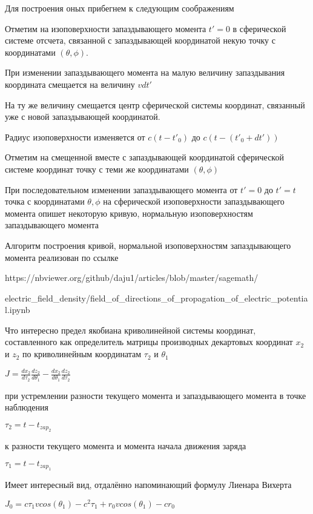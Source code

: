 \documentclass{article}
\begin{document}
Для построения оных прибегнем к следующим соображениям 

Отметим на изоповерхности запаздывающего момента $t'=0$ в сферической системе отсчета, связанной с запаздывающей координатой некую точку с координатами $(\theta, \phi)$.

При изменении запаздывающего момента на малую величину запаздывания координата смещается на величину $v dt'$

На ту же величину смещается центр сферической системы координат, связанный уже с новой запаздывающей координатой.

Радиус изоповерхности изменяется от $c(t-t'_{0})$ до $c(t-(t'_{0} + d t'))$


Отметим на смещенной вместе с запаздывающей координатой сферической системе координат точку с теми же координатами $(\theta, \phi)$


При последовательном изменении запаздывающего момента от $t'=0$ до $t'=t$ точка с координатами $\theta, \phi$ на сферической изоповерхности запаздывающего момента опишет некоторую кривую, нормальную изоповерхностям запаздывающего момента

Алгоритм построения кривой, нормальной изоповерхностям запаздывающего момента реализован по ссылке

https://nbviewer.org/github/daju1/articles/blob/master/sagemath/

electric\_field\_density/field\_of\_directions\_of\_propagation\_of\_electric\_potential.ipynb



Что интересно предел якобиана криволинейной системы координат, составленного как определитель матрицы производных декартовых координат $x_2$ и $z_2$ по криволинейным координатам $\tau_2$ и $\theta_1$ 


\(J = \frac{d x_2}{d \tau_2} \frac{d z_2}{d \theta_1} - \frac{d x_2}{d \theta_1} \frac{d z_2}{d \tau_2}\)

при устремлении разности текущего момента и запаздывающего момента в точке наблюдения

\(\tau_2 = t - t_{{zap}_2}\)

к разности текущего момента и момента начала движения заряда

\(\tau_1 = t - t_{{zap}_1}\)

Имеет интересный вид, отдалённо напоминающий формулу Лиенара Вихерта

$J_0 =  c \tau_1 v cos(\theta_1) - c^2 \tau_1 + r_0 v cos(\theta_1) - c r_0$
\end{document}
